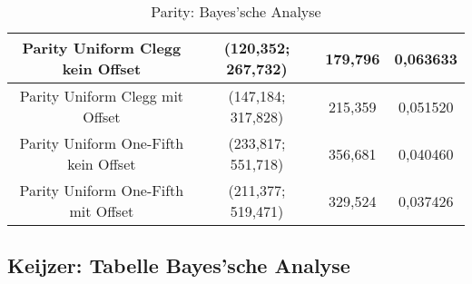 \begin{table}[H]
\begin{tabular}{c | c | c | c}
		\hline
		Parity Uniform Clegg kein Offset & (120,352; 267,732) & 179,796 & 0,063633\\
		\hline
		Parity Uniform Clegg mit Offset & (147,184; 317,828) & 215,359 & 0,051520\\
		\hline
		Parity Uniform One-Fifth kein Offset & \color{red}(233,817; 551,718)\color{black} & 356,681 & \color{red}0,040460\color{black}\\
		\hline
		Parity Uniform One-Fifth mit Offset & (211,377; 519,471) & 329,524 & \color{red}0,037426\color{black}\\
	\end{tabular}
	\caption{Parity: Bayes'sche Analyse}
	\label{table:parityBayesian}
\end{table}


\subsection{Keijzer: Tabelle Bayes'sche Analyse}
\label{subsec:appendixTabelleBayesKeijzer}

